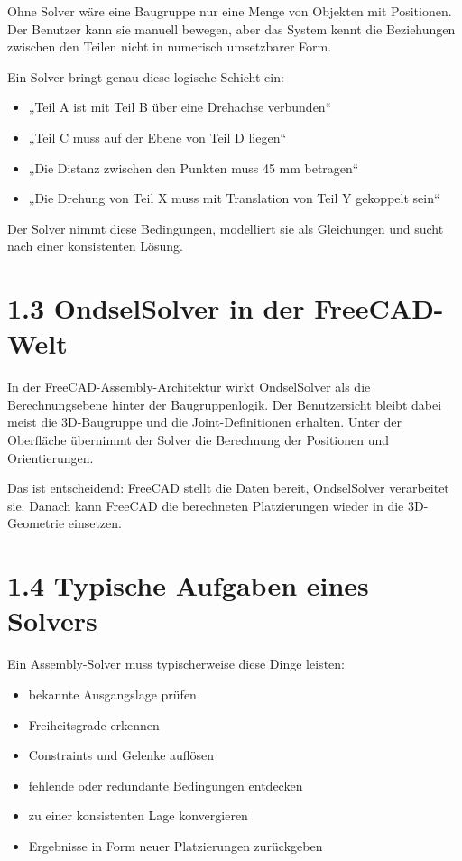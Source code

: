 \documentclass[
  12pt
]{book}
\providecommand{\tightlist}{%
  \setlength{\itemsep}{0pt}\setlength{\parskip}{0pt}}
\begin{document}
Ohne Solver wäre eine Baugruppe nur eine Menge von Objekten mit
Positionen. Der Benutzer kann sie manuell bewegen, aber das System kennt
die Beziehungen zwischen den Teilen nicht in numerisch umsetzbarer Form.

Ein Solver bringt genau diese logische Schicht ein:

\begin{itemize}
\tightlist
\item
  „Teil A ist mit Teil B über eine Drehachse verbunden``
\item
  „Teil C muss auf der Ebene von Teil D liegen``
\item
  „Die Distanz zwischen den Punkten muss 45 mm betragen``
\item
  „Die Drehung von Teil X muss mit Translation von Teil Y gekoppelt
  sein``
\end{itemize}

Der Solver nimmt diese Bedingungen, modelliert sie als Gleichungen und
sucht nach einer konsistenten Lösung.

\hypertarget{ondselsolver-in-der-freecad-welt}{%
\section{\texorpdfstring{{1.3} OndselSolver in der
FreeCAD-Welt}{1.3 OndselSolver in der FreeCAD-Welt}}\label{ondselsolver-in-der-freecad-welt}}

In der FreeCAD-Assembly-Architektur wirkt OndselSolver als die
Berechnungsebene hinter der Baugruppenlogik. Der Benutzersicht bleibt
dabei meist die 3D-Baugruppe und die Joint-Definitionen erhalten. Unter
der Oberfläche übernimmt der Solver die Berechnung der Positionen und
Orientierungen.

Das ist entscheidend: FreeCAD stellt die Daten bereit, OndselSolver
verarbeitet sie. Danach kann FreeCAD die berechneten Platzierungen
wieder in die 3D-Geometrie einsetzen.

\hypertarget{typische-aufgaben-eines-solvers}{%
\section{\texorpdfstring{{1.4} Typische Aufgaben eines
Solvers}{1.4 Typische Aufgaben eines Solvers}}\label{typische-aufgaben-eines-solvers}}

Ein Assembly-Solver muss typischerweise diese Dinge leisten:

\begin{itemize}
\tightlist
\item
  bekannte Ausgangslage prüfen
\item
  Freiheitsgrade erkennen
\item
  Constraints und Gelenke auflösen
\item
  fehlende oder redundante Bedingungen entdecken
\item
  zu einer konsistenten Lage konvergieren
\item
  Ergebnisse in Form neuer Platzierungen zurückgeben
\end{itemize}
\end{document}
